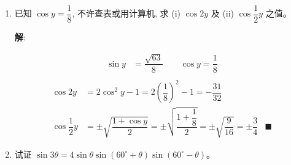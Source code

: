 \documentclass{report}
\newcommand{\sol}{\vspace{0.2cm}\textbf{解}:}
\begin{document}
\begin{enumerate}[leftmargin=*]
        \sol{}
        \begin{align*}
            &\ \ \ \cos ^2 x+\cos ^2\left(x+\dfrac{2 \pi}{3}\right)+\cos ^2\left(x+\dfrac{4 \pi}{3}\right)\\
            &= \cos ^2 x + \left[\cos x \cos \dfrac{2 \pi}{3} - \sin x \sin \dfrac{2 \pi}{3}\right]^2 + \left[\cos x \cos \dfrac{4 \pi}{3} - \sin x \sin \dfrac{4 \pi}{3}\right]^2\\
            &= \cos ^2 x + \left[-\dfrac{1}{2}\cos x - \dfrac{\sqrt{3}}{2}\sin x\right]^2 + \left[-\dfrac{1}{2}\cos x + \dfrac{\sqrt{3}}{2}\sin x\right]^2\\
            &= \cos ^2 x + \dfrac{1}{4}\cos ^2 x + \dfrac{3}{4}\sin ^2 x + \dfrac{1}{4}\cos ^2 x + \dfrac{3}{4}\sin ^2 x\\
            &= \dfrac{3}{2}\cos ^2 x + \dfrac{3}{2}\sin ^2 x\\
            &= \dfrac{3}{2}(\cos ^2 x + \sin ^2 x)\\
            &= \dfrac{3}{2} & \blacksquare
        \end{align*}
        
        \item 已知 $\cos y=\dfrac{1}{8}$, 不许查表或用计算机, 求 (i) $\cos 2 y$ 及 (ii) $\cos \dfrac{1}{2} y$ 之值。
        
        \sol{}
        \begin{center}
        \end{center}
        \begin{align*}
            \sin y &= \dfrac{\sqrt{63}}{8} \qquad \cos y = \dfrac{1}{8}\\
        \end{align*}
        \begin{align*}
            \cos 2y &= 2\cos^2 y - 1 = 2\left(\dfrac{1}{8}\right)^2 - 1 = -\dfrac{31}{32}\\
            \cos \dfrac{1}{2}y &= \pm\sqrt{\dfrac{1+\cos y}{2}} = \pm\sqrt{\dfrac{1+\dfrac{1}{8}}{2}} = \pm\sqrt{\dfrac{9}{16}} = \pm\dfrac{3}{4} & \blacksquare
        \end{align*}
                
        \item 试证 $\sin 3 \theta=4 \sin \theta \sin \left(60^{\circ}+\theta\right) \sin \left(60^{\circ}-\theta\right)$。
        

\end{enumerate}
\end{document}
